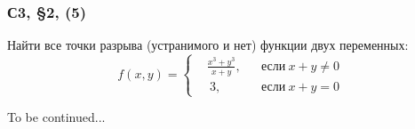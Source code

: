 \documentclass[a4paper,12pt]{article}
\begin{document}
  \subsubsection{С3, \S 2, (5)}

  Найти все точки разрыва (устранимого и нет) функции двух переменных:
  \[
    f(x, y) = \left\{
      \begin{aligned}
        &\frac{x^3 + y^3}{x + y}, & &\mbox{если}\ x + y \not= 0\\
        &\ 3,                       & &\mbox{если}\ x + y = 0
      \end{aligned}
    \right.
  \]
  
  \begin{solution}
    To be continued...
  \end{solution}


  


  


  
\end{document}
